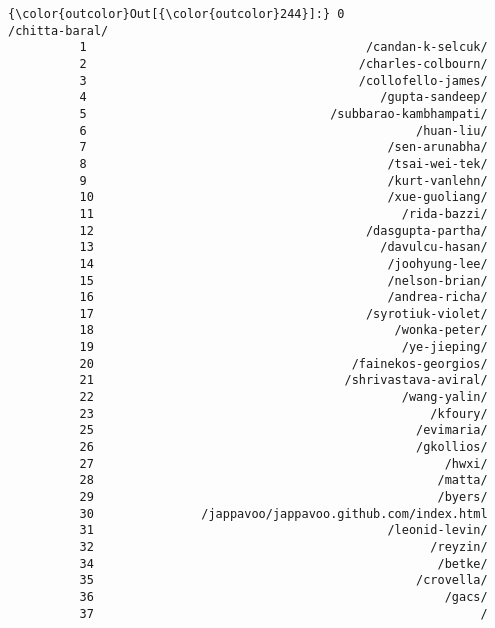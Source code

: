 \documentclass[11pt]{article}
\begin{document}
            \begin{Verbatim}[commandchars=\\\{\}]
{\color{outcolor}Out[{\color{outcolor}244}]:} 0                                          /chitta-baral/
          1                                       /candan-k-selcuk/
          2                                      /charles-colbourn/
          3                                      /collofello-james/
          4                                         /gupta-sandeep/
          5                                  /subbarao-kambhampati/
          6                                              /huan-liu/
          7                                          /sen-arunabha/
          8                                          /tsai-wei-tek/
          9                                          /kurt-vanlehn/
          10                                         /xue-guoliang/
          11                                           /rida-bazzi/
          12                                      /dasgupta-partha/
          13                                        /davulcu-hasan/
          14                                         /joohyung-lee/
          15                                         /nelson-brian/
          16                                         /andrea-richa/
          17                                      /syrotiuk-violet/
          18                                          /wonka-peter/
          19                                           /ye-jieping/
          20                                    /fainekos-georgios/
          21                                   /shrivastava-aviral/
          22                                           /wang-yalin/
          23                                               /kfoury/
          25                                             /evimaria/
          26                                             /gkollios/
          27                                                 /hwxi/
          28                                                /matta/
          29                                                /byers/
          30               /jappavoo/jappavoo.github.com/index.html
          31                                         /leonid-levin/
          32                                               /reyzin/
          34                                                /betke/
          35                                             /crovella/
          36                                                 /gacs/
          37                                                      /

\end{Verbatim}
\end{document}
